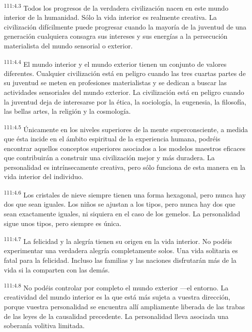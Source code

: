 \documentclass[twoside, 11pt]{book}
\begin{document}
\par
\textsuperscript{111:4.3} Todos los progresos de la verdadera civilización nacen en este mundo interior de la humanidad. Sólo la vida interior es realmente creativa. La civilización difícilmente puede progresar cuando la mayoría de la juventud de una generación cualquiera consagra sus intereses y sus energías a la persecución materialista del mundo sensorial o exterior.

\par
\textsuperscript{111:4.4} El mundo interior y el mundo exterior tienen un conjunto de valores diferentes. Cualquier civilización está en peligro cuando las tres cuartas partes de su juventud se meten en profesiones materialistas y se dedican a buscar las actividades sensoriales del mundo exterior. La civilización está en peligro cuando la juventud deja de interesarse por la ética, la sociología, la eugenesia, la filosofía, las bellas artes, la religión y la cosmología.

\par
\textsuperscript{111:4.5} Únicamente en los niveles superiores de la mente superconsciente, a medida que ésta incide en el ámbito espiritual de la experiencia humana, podréis encontrar aquellos conceptos superiores asociados a los modelos maestros eficaces que contribuirán a construir una civilización mejor y más duradera. La personalidad es intrínsecamente creativa, pero sólo funciona de esta manera en la vida interior del individuo.

\par
\textsuperscript{111:4.6} Los cristales de nieve siempre tienen una forma hexagonal, pero nunca hay dos que sean iguales. Los niños se ajustan a los tipos, pero nunca hay dos que sean exactamente iguales, ni siquiera en el caso de los gemelos. La personalidad sigue unos tipos, pero siempre es única.

\par
\textsuperscript{111:4.7} La felicidad y la alegría tienen su origen en la vida interior. No podéis experimentar una verdadera alegría completamente solos. Una vida solitaria es fatal para la felicidad. Incluso las familias y las naciones disfrutarán más de la vida si la comparten con las demás.

\par
\textsuperscript{111:4.8} No podéis controlar por completo el mundo exterior ---el entorno. La creatividad del mundo interior es la que está más sujeta a vuestra dirección, porque vuestra personalidad se encuentra allí ampliamente liberada de las trabas de las leyes de la causalidad precedente. La personalidad lleva asociada una soberanía volitiva limitada.
\end{document}
